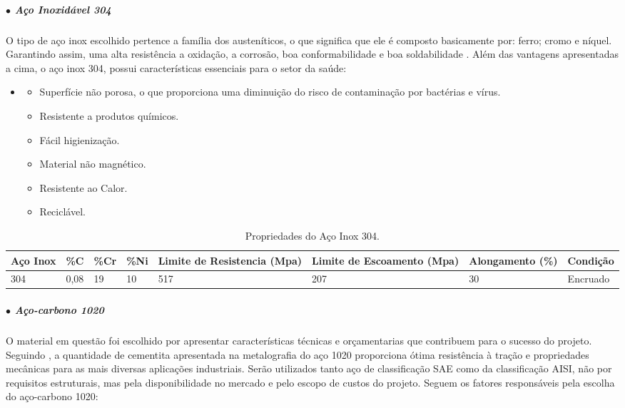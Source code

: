 \subparagraph*{$\bullet$ Aço Inoxidável 304} \hfill

O tipo de aço inox escolhido pertence a família dos austeníticos, o que significa que ele é composto basicamente por: ferro; cromo e níquel. Garantindo assim, uma alta resistência a oxidação, a corrosão, boa conformabilidade e boa soldabilidade \cite{Askeland_Wright_2019}. Além das vantagens apresentadas a cima, o aço inox 304, possui características essenciais para o setor da saúde:
\begin{itemize}
    \item []

    \begin{itemize}
        \item Superfície não porosa, o que proporciona uma diminuição do risco de contaminação por bactérias e vírus.
        \item Resistente a produtos químicos.
        \item Fácil higienização.
        \item Material não magnético. 
        \item Resistente ao Calor.
        \item Reciclável.
    \end{itemize}
\end{itemize}
    

\begin{table}[H]
    \centering
    \caption{Propriedades do Aço Inox 304.}
    \label{fig:PropAI}
    \begin{adjustbox}{max width = \textwidth}
        \begin{tabular}{|L{2cm}|C{2cm}|C{2cm}|C{2cm}|C{3cm}|C{3cm}|C{2.8cm}|C{2cm}|}
            \hline
            \textbf{Aço Inox} & \textbf{\%C} & \textbf{\%Cr} & \textbf{\%Ni} & \textbf{Limite de Resistencia (Mpa)} & \textbf{Limite de Escoamento (Mpa)} & \textbf{Alongamento (\%)} & \textbf{Condição}  \\ \hline
            
              304 & 0,08 & 19 & 10  & 517 & 207 & 30 & Encruado
             \\ \hline
            
        \end{tabular}
    \end{adjustbox}
\end{table}

\subparagraph*{$\bullet$ Aço-carbono 1020} \hfill

O material em questão foi escolhido por apresentar características técnicas e orçamentarias que contribuem para o sucesso do projeto. Seguindo \cite{Aco_1020_ensaio}, a quantidade de cementita apresentada na metalografia do aço 1020 proporciona ótima resistência à traç{\~a}o e propriedades mecânicas para as mais diversas aplicações industriais. Serão utilizados tanto aço de classificação SAE como da classificação AISI, não por requisitos estruturais, mas pela disponibilidade no mercado e pelo escopo de custos do projeto. Seguem os fatores responsáveis pela escolha do aço-carbono 1020:

